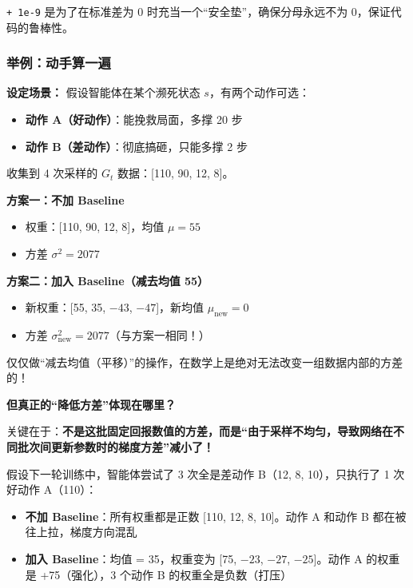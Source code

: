 \documentclass[12pt,a4paper]{article}
\theoremstyle{noteplain}
\theoremstyle{noteexercise}
\begin{document}
\lstinline|+ 1e-9| 是为了在标准差为 $0$ 时充当一个``安全垫''，确保分母永远不为 $0$，保证代码的鲁棒性。

\subsubsection{举例：动手算一遍}\label{ssec:variance-example}

\textbf{设定场景：} 假设智能体在某个濒死状态 $s$，有两个动作可选：
\begin{itemize}
  \setlength{\itemsep}{0.2em}
  \item \textbf{动作 A（好动作）}：能挽救局面，多撑 20 步
  \item \textbf{动作 B（差动作）}：彻底搞砸，只能多撑 2 步
\end{itemize}

收集到 4 次采样的 $G_t$ 数据：[110, 90, 12, 8]。

\textbf{方案一：不加 Baseline}
\begin{itemize}
  \setlength{\itemsep}{0.2em}
  \item 权重：[110, 90, 12, 8]，均值 $\mu = 55$
  \item 方差 $\sigma^2 = 2077$
\end{itemize}

\textbf{方案二：加入 Baseline（减去均值 55）}
\begin{itemize}
  \setlength{\itemsep}{0.2em}
  \item 新权重：[55, 35, $-43$, $-47$]，新均值 $\mu_{\text{new}} = 0$
  \item 方差 $\sigma_{\text{new}}^2 = 2077$（与方案一相同！）
\end{itemize}

\begin{keypoint}[注意]
  仅仅做``减去均值（平移）''的操作，在数学上是绝对无法改变一组数据内部的方差的！
\end{keypoint}

\textbf{但真正的``降低方差''体现在哪里？}

关键在于：\textbf{不是这批固定回报数值的方差，而是``由于采样不均匀，导致网络在不同批次间更新参数时的梯度方差''减小了！}

假设下一轮训练中，智能体尝试了 3 次全是差动作 B（12, 8, 10），只执行了 1 次好动作 A（110）：

\begin{itemize}
  \setlength{\itemsep}{0.2em}
  \item \textbf{不加 Baseline}：所有权重都是正数 [110, 12, 8, 10]。动作 A 和动作 B 都在被往上拉，梯度方向混乱
  \item \textbf{加入 Baseline}：均值 = 35，权重变为 [75, $-23$, $-27$, $-25$]。动作 A 的权重是 +75（强化），3 个动作 B 的权重全是负数（打压）
\end{itemize}
\end{document}
